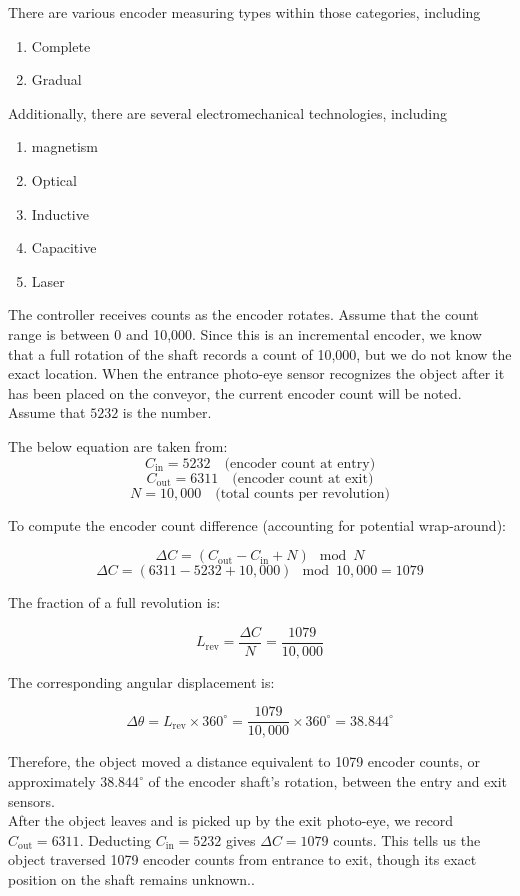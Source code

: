 \documentclass[12pt]{article}
\begin{document}
There are various encoder measuring types within those categories, including
\begin{enumerate}
    \item Complete
    \item Gradual
\end{enumerate}
Additionally, there are several electromechanical technologies, including
\begin{enumerate}
    \item magnetism
    \item Optical
    \item Inductive
    \item Capacitive
    \item Laser 
\end{enumerate}

The controller receives counts as the encoder rotates. Assume that the count range is between 0 and 10,000. Since this is an incremental encoder, we know that a full rotation of the shaft records a count of 10,000, but we do not know the exact location. When the entrance photo-eye sensor recognizes the object after it has been placed on the conveyor, the current encoder count will be noted. Assume that $5232$ is the number\cite{ref27}.

The below equation are taken from: \cite{ref27}
\[
C_{\text{in}} = 5232 \quad \text{(encoder count at entry)}
\]
\[
C_{\text{out}} = 6311 \quad \text{(encoder count at exit)}
\]
\[
N = 10{,}000 \quad \text{(total counts per revolution)} 
\]

To compute the encoder count difference (accounting for potential wrap-around):

\[
\Delta C = (C_{\text{out}} - C_{\text{in}} + N) \mod N 
\]
\[
\Delta C = (6311 - 5232 + 10{,}000) \mod 10{,}000 = 1079 
\]

The fraction of a full revolution is:

\[
L_{\text{rev}} = \frac{\Delta C}{N} = \frac{1079}{10{,}000} 
\]

The corresponding angular displacement is:

\[
\Delta \theta = L_{\text{rev}} \times 360^\circ = \frac{1079}{10{,}000} \times 360^\circ = 38.844^\circ 
\]

\noindent
Therefore, the object moved a distance equivalent to 1079 encoder counts, or approximately $38.844^\circ$ of the encoder shaft's rotation, between the entry and exit sensors\cite{ref27}.\\

After the object leaves and is picked up by the exit photo-eye, we record $C_{\mathrm{out}}=6311$.  Deducting $C_{\mathrm{in}}=5232$ gives $\Delta C=1079$ counts.  This tells us the object traversed 1079 encoder counts from entrance to exit, though its exact position on the shaft remains unknown.\cite{ref27}.
\end{document}
